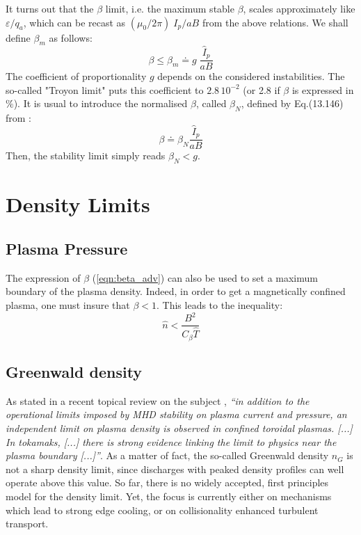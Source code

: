 It turns out that the $\beta$ limit, i.e. the maximum stable $\beta$, scales approximately like $\varepsilon/q_a$, which can be recast as $(\mu_0/2\pi)\; I_p/aB$ from the above relations. We shall define $\beta_m$ as follows:
\begin{equation*}
\beta \leqslant \beta_m \doteq g\; \frac{\hat I_p}{a B}
\end{equation*}
The coefficient of proportionality $g$ depends on the considered instabilities. The so-called "Troyon limit"  puts this coefficient to $2.8\, 10^{-2}$ (or 2.8 if $\beta$ is expressed in $\%$).
It is usual to introduce the normalised $\beta$, called $\beta_N$, defined by Eq.(13.146) from :
\begin{equation}
\beta \doteq \beta_N \frac{\hat I_p}{a B}
\end{equation}
Then, the stability limit simply reads $\beta_N <g$.

\section{Density Limits}
\subsection{Plasma Pressure}
The expression of $\beta$ (\ref{eqn:beta_adv}) can also be used to set a maximum boundary of the plasma density. Indeed, in order to get a magnetically confined plasma, one must insure that $\beta < 1$. This leads to the inequality:
\begin{equation}
    \hat n < \frac{B^2}{C_\beta \hat T}
\end{equation}


\subsection{Greenwald density}

As stated in a recent topical review on the subject , \emph{``in addition to the operational limits imposed by MHD stability on plasma current and pressure, an independent limit on plasma density is observed in confined toroidal plasmas. [...] In tokamaks, [...] there is strong evidence linking the limit to physics near the plasma boundary [...]''}. As a matter of fact, the so-called Greenwald density $n_G$ is not a sharp density limit, since discharges with peaked density profiles can well operate above this value. So far, there is no widely accepted, first principles model for the density limit. Yet, the focus is currently either on mechanisms which lead to strong edge cooling, or on collisionality enhanced turbulent transport.

